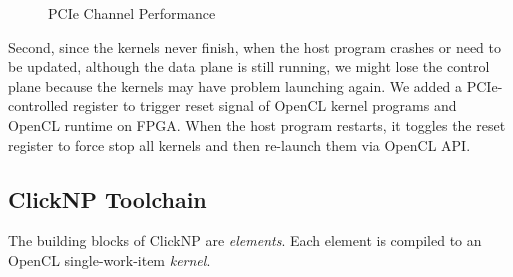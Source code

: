 {\begin{figure}[h!]
	\centering
	\vspace{-0.15in}
	\caption{PCIe Channel Performance}
	\vspace{-0.15in}
	\label{clicknp:fig:PCIeChannelPerf}
\end{figure}

Second, since the kernels never finish, when the host program crashes or need to be updated, although the data plane is still running, we might lose the control plane because the kernels may have problem launching again. We added a PCIe-controlled register to trigger reset signal of OpenCL kernel programs and OpenCL runtime on FPGA. When the host program restarts, it toggles the reset register to force stop all kernels and then re-launch them via OpenCL API.

\subsection{ClickNP Toolchain}

The building blocks of ClickNP are \textit{elements}. Each element is compiled to an OpenCL single-work-item \textit{kernel}.

}
